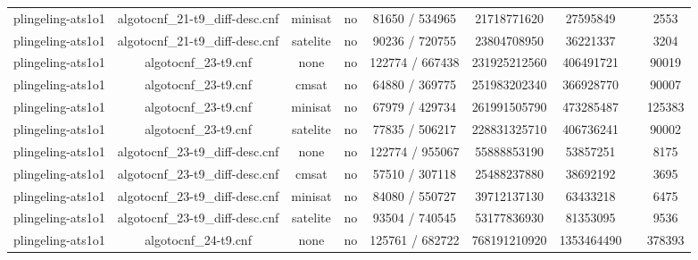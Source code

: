 \begin{appendices}
\begin{table}[p]
\begin{center}
\begin{tabular}{l|cccccccc}
  plingeling-ats1o1              & algotocnf\_21-t9\_diff-desc.cnf & minisat    & no    & 81650 / 534965 & 21718771620 & 27595849  &            & 2553 \\ %
  plingeling-ats1o1              & algotocnf\_21-t9\_diff-desc.cnf & satelite   & no    & 90236 / 720755 & 23804708950 & 36221337  &            & 3204 \\ %
  plingeling-ats1o1              & algotocnf\_23-t9.cnf           & none       & no    & 122774 / 667438 & 231925212560 & 406491721 &            & 90019 \\ %
  plingeling-ats1o1              & algotocnf\_23-t9.cnf           & cmsat      & no    & 64880 / 369775 & 251983202340 & 366928770 &            & 90007 \\ %
  plingeling-ats1o1              & algotocnf\_23-t9.cnf           & minisat    & no    & 67979 / 429734 & 261991505790 & 473285487 &            & 125383 \\ %
  plingeling-ats1o1              & algotocnf\_23-t9.cnf           & satelite   & no    & 77835 / 506217 & 228831325710 & 406736241 &            & 90002 \\ %
  plingeling-ats1o1              & algotocnf\_23-t9\_diff-desc.cnf & none       & no    & 122774 / 955067 & 55888853190 & 53857251  &            & 8175 \\ %
  plingeling-ats1o1              & algotocnf\_23-t9\_diff-desc.cnf & cmsat      & no    & 57510 / 307118 & 25488237880 & 38692192  &            & 3695 \\ %
  plingeling-ats1o1              & algotocnf\_23-t9\_diff-desc.cnf & minisat    & no    & 84080 / 550727 & 39712137130 & 63433218  &            & 6475 \\ %
  plingeling-ats1o1              & algotocnf\_23-t9\_diff-desc.cnf & satelite   & no    & 93504 / 740545 & 53177836930 & 81353095  &            & 9536 \\ %
  plingeling-ats1o1              & algotocnf\_24-t9.cnf           & none       & no    & 125761 / 682722 & 768191210920 & 1353464490 &            & 378393 \\ %

\end{tabular}
\end{center}
\end{table}
\end{appendices}
